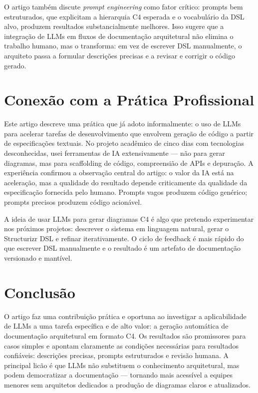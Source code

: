 \documentclass[12pt,a4paper]{article}
\begin{document}
O artigo tamb\'em discute \textit{prompt engineering} como fator cr\'itico:
prompts bem estruturados, que explicitam a hierarquia C4 esperada e o vocabul\'ario
da DSL alvo, produzem resultados substancialmente melhores. Isso sugere que a
integra\c{c}\~ao de LLMs em fluxos de documenta\c{c}\~ao arquitetural n\~ao
elimina o trabalho humano, mas o transforma: em vez de escrever DSL manualmente,
o arquiteto passa a formular descri\c{c}\~oes precisas e a revisar e corrigir o
c\'odigo gerado.

\section{Conex\~ao com a Pr\'atica Profissional}

Este artigo descreve uma pr\'atica que j\'a adoto informalmente: o uso de LLMs
para acelerar tarefas de desenvolvimento que envolvem geração de c\'odigo a partir
de especifica\c{c}\~oes textuais. No projeto acad\^emico de cinco dias com
tecnologias desconhecidas, usei ferramentas de IA extensivamente --- n\~ao para
gerar diagramas, mas para scaffolding de c\'odigo, compreensi\~ao de APIs e
depura\c{c}\~ao. A experi\^encia confirmou a observa\c{c}\~ao central do artigo:
o valor da IA est\'a na acelera\c{c}\~ao, mas a qualidade do resultado depende
criticamente da qualidade da especifica\c{c}\~ao fornecida pelo humano. Prompts
vagos produzem c\'odigo gen\'erico; prompts precisos produzem c\'odigo acion\'avel.

A ideia de usar LLMs para gerar diagramas C4 \'e algo que pretendo experimentar
nos pr\'oximos projetos: descrever o sistema em linguagem natural, gerar o
Structurizr DSL e refinar iterativamente. O ciclo de feedback \'e mais r\'apido
do que escrever DSL manualmente e o resultado \'e um artefato de documenta\c{c}\~ao
versionado e mant\'ivel.

\section{Conclus\~ao}

O artigo faz uma contribui\c{c}\~ao pr\'atica e oportuna ao investigar a
aplicabilidade de LLMs a uma tarefa espec\'ifica e de alto valor: a gera\c{c}\~ao
autom\'atica de documenta\c{c}\~ao arquitetural em formato C4. Os resultados s\~ao
promissores para casos simples e apontam claramente as condi\c{c}\~oes necess\'arias
para resultados confi\'aveis: descri\c{c}\~oes precisas, prompts estruturados e
revis\~ao humana. A principal lic\~ao \'e que LLMs n\~ao substituem o conhecimento
arquitetural, mas podem democratizar a documenta\c{c}\~ao --- tornando mais
acess\'ivel a equipes menores sem arquitetos dedicados a produ\c{c}\~ao de
diagramas claros e atualizados.
\end{document}
